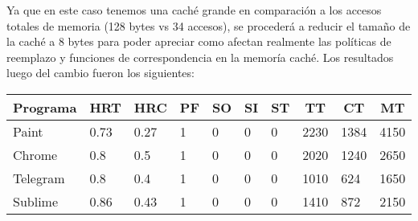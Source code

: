 \documentclass{article}
\begin{document}
Ya que en este caso tenemos una caché grande en comparación a los accesos totales de memoria (128 bytes vs 34 accesos), se procederá a reducir el tamaño de la caché a 8 bytes para poder apreciar como afectan realmente las políticas de reemplazo y funciones de correspondencia en la memoría caché. Los resultados luego del cambio fueron los siguientes:

\begin{table}[H]
\begin{tabular}{|l|l|l|l|l|l|l|l|l|l|}
\hline
\multicolumn{1}{|c|}{\textbf{Programa}} & \multicolumn{1}{c|}{\textbf{HRT}} & \multicolumn{1}{c|}{\textbf{HRC}} & \multicolumn{1}{c|}{\textbf{PF}} & \multicolumn{1}{c|}{\textbf{SO}} & \multicolumn{1}{c|}{\textbf{SI}} & \multicolumn{1}{c|}{\textbf{ST}} & \multicolumn{1}{c|}{\textbf{TT}} & \multicolumn{1}{c|}{\textbf{CT}} & \multicolumn{1}{c|}{\textbf{MT}} \\ \hline
Paint                                   & 0.73                              & 0.27                              & 1                                & 0                                & 0                                & 0                                & 2230                             & 1384                             & 4150                             \\ \hline
Chrome                                  & 0.8                               & 0.5                               & 1                                & 0                                & 0                                & 0                                & 2020                             & 1240                             & 2650                             \\ \hline
Telegram                                & 0.8                               & 0.4                               & 1                                & 0                                & 0                                & 0                                & 1010                             & 624                              & 1650                             \\ \hline
Sublime                                 & 0.86                              & 0.43                              & 1                                & 0                                & 0                                & 0                                & 1410                             & 872                              & 2150                             \\ \hline
\end{tabular}
\end{table}
\end{document}
